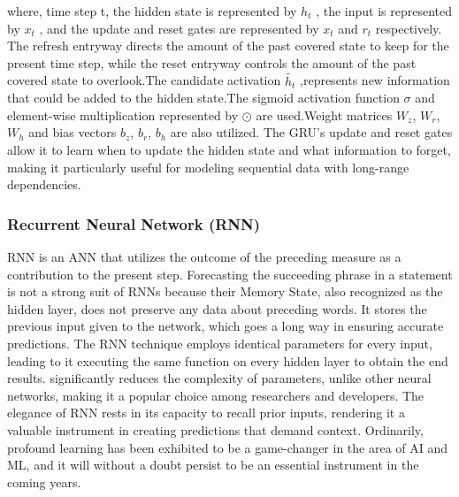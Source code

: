 \documentclass[a4paper,fleqn]{cas-sc}
\begin{document}

where, time step t, the hidden state is represented by $ h_t $ , the input is represented by $ x_t $ , and the update and reset gates are
represented by $ x_t $ and $ r_t$ respectively. The refresh entryway directs the amount of the past covered state to keep for the present time step, while the reset entryway controls the amount of the past covered state to overlook.The candidate activation $\tilde{h_t}$ ,represents new information that could be added to the hidden state.The sigmoid activation function $ \sigma $ and element-wise multiplication represented by $\odot$ are used.Weight matrices $ W_z $, $ W_r $, $ W_h $ and bias vectors $ b_z $, $ b_r $, $ b_h $ are also utilized. The GRU's update and reset gates allow it to learn when to update the hidden state and what information to forget, making it particularly useful for modeling sequential data with long-range dependencies.
\subsubsection{Recurrent Neural Network (RNN)}
RNN is an ANN that utilizes the outcome of the preceding measure as a contribution to the present step. Forecasting the succeeding phrase in a statement is not a strong suit of RNNs because their Memory State, also recognized as the hidden layer, does not preserve any data about preceding words. It stores the previous input given to the network, which goes a long way in ensuring accurate predictions. The RNN technique employs identical parameters for every input, leading to it executing the same function on every hidden layer to obtain the end results. significantly reduces the complexity of parameters, unlike other neural networks, making it a popular choice among researchers and developers. The elegance of RNN rests in its capacity to recall prior inputs, rendering it a valuable instrument in creating predictions that demand context. Ordinarily, profound learning has been exhibited to be a game-changer in the area of AI and ML, and it will without a doubt persist to be an essential instrument in the coming years.
\end{document}
